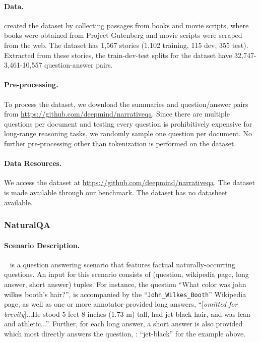 \paragraph{Data.}
\citet{kovcisky2017narrativeqa} created the dataset by collecting passages from books and movie scripts, where books were obtained from Project Gutenberg and movie scripts were scraped from the web. The dataset has 1,567 stories (1,102 training, 115 dev, 355 test). Extracted from these stories, the train-dev-test splits for the dataset have 32,747-3,461-10,557 question-answer pairs.

\paragraph{Pre-processing.}
To process the dataset, we download the summaries and question/answer pairs from \url{https://github.com/deepmind/narrativeqa}. Since there are multiple questions per document and testing every question is prohibitively expensive for long-range reasoning tasks, we randomly sample one question per document. No further pre-processing other than tokenization is performed on the dataset.

\paragraph{Data Resources.}
We access the dataset at \url{https://github.com/deepmind/narrativeqa}.
The dataset is made available through our benchmark.
The dataset has no datasheet available.

\subsubsection{NaturalQA}
\paragraph{Scenario Description.}
\naturalquestions~\citep{kwiatkowski2019natural} is a question answering scenario that features factual naturally-occurring questions.
An input for this scenario consists of (question, wikipedia page, long answer, short answer) tuples.
For instance, the question ``What color was john wilkes booth’s hair?'', is accompanied by the ``\texttt{John\_Wilkes\_Booth}'' Wikipedia page, as well as one or more annotator-provided long answers, \eg ``[\emph{omitted for brevity}]...He stood 5 feet 8 inches (1.73 m) tall, had jet-black hair, and was lean and athletic...''.
Further, for each long answer, a short answer is also provided which most directly answers the question, \eg: ``jet-black'' for the example above.

